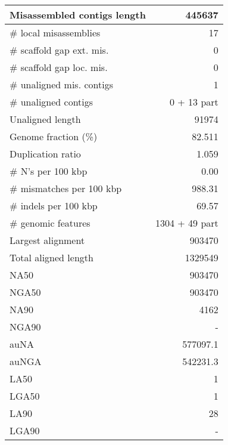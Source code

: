 \documentclass[12pt,a4paper]{article}
\begin{document}
\begin{table}[ht]
\begin{center}
\begin{tabular}{|l*{1}{|r}|}
Misassembled contigs length & 445637 \\ \hline
\# local misassemblies & 17 \\ \hline
\# scaffold gap ext. mis. & 0 \\ \hline
\# scaffold gap loc. mis. & 0 \\ \hline
\# unaligned mis. contigs & 1 \\ \hline
\# unaligned contigs & 0 + 13 part \\ \hline
Unaligned length & 91974 \\ \hline
Genome fraction (\%) & 82.511 \\ \hline
Duplication ratio & 1.059 \\ \hline
\# N's per 100 kbp & 0.00 \\ \hline
\# mismatches per 100 kbp & 988.31 \\ \hline
\# indels per 100 kbp & 69.57 \\ \hline
\# genomic features & 1304 + 49 part \\ \hline
Largest alignment & 903470 \\ \hline
Total aligned length & 1329549 \\ \hline
NA50 & 903470 \\ \hline
NGA50 & 903470 \\ \hline
NA90 & 4162 \\ \hline
NGA90 & - \\ \hline
auNA & 577097.1 \\ \hline
auNGA & 542231.3 \\ \hline
LA50 & 1 \\ \hline
LGA50 & 1 \\ \hline
LA90 & 28 \\ \hline
LGA90 & - \\ \hline
\end{tabular}
\end{center}
\end{table}
\end{document}
